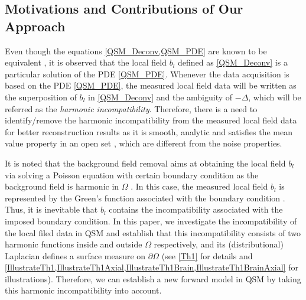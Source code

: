 \documentclass[reqno]{siamonline1116}
\numberwithin{theorem}{section}
\numberwithin{equation}{section}
\def\R{{\mathbb R}}
\def\Om{\Omega}
\def\p{\partial}
\begin{document}
\subsection{Motivations and Contributions of Our Approach}\label{OurApproach}

Even though the equations \cref{QSM_Deconv,QSM_PDE} are known to be equivalent \cite{J.K.Choi2014,Y.Kee2017,B.Palacios2017}, it is observed that the local field $b_l$ defined as \cref{QSM_Deconv} is a particular solution of the PDE \cref{QSM_PDE}. Whenever the data acquisition is based on the PDE \cref{QSM_PDE}, the measured local field data will be written as the superposition of $b_l$ in \cref{QSM_Deconv} and the ambiguity of $-\Delta$, which will be referred as the \emph{harmonic incompatibility}. Therefore, there is a need to identify/remove the harmonic incompatibility from the measured local field data for better reconstruction results as it is smooth, analytic and satisfies the mean value property in an open set \cite{Evans2010}, which are different from the noise properties.

It is noted that the background field removal aims at obtaining the local field $b_l$ via solving a Poisson equation with certain boundary condition as the background field is harmonic in $\Om$ \cite{W.Li2014,F.Schweser2010,Y.Wang2015,D.Zhou2014}. In this case, the measured local field $b_l$ is represented by the Green's function associated with the boundary condition \cite{J.K.Choi2014}. Thus, it is inevitable that $b_l$ contains the incompatibility associated with the imposed boundary condition. In this paper, we investigate the incompatibility of the local filed data in QSM and establish that this incompatibility consists of two harmonic functions inside and outside $\Om$ respectively, and its (distributional) Laplacian defines a surface measure on $\p\Om$ (see \cref{Th1} for details and \cref{IllustrateTh1,IllustrateTh1Axial,IllustrateTh1Brain,IllustrateTh1BrainAxial} for illustrations). Therefore, we can establish a new forward model in QSM by taking this harmonic incompatibility into account.


\end{document}
